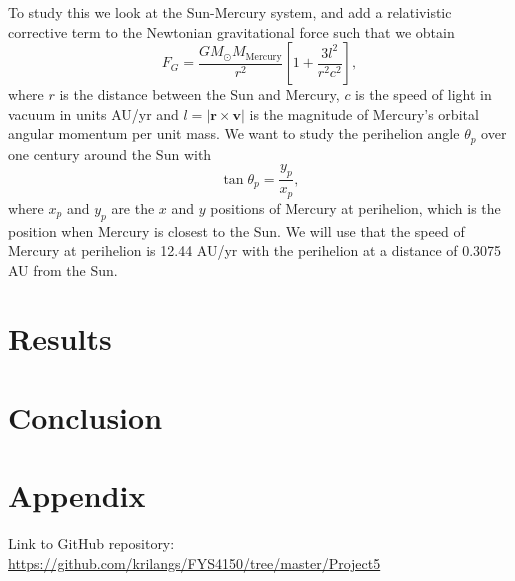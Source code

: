 \documentclass[12pt,a4paper,english]{article}
\begin{document}
To study this we look at the Sun-Mercury system, and add a relativistic corrective term to the Newtonian gravitational force such that we obtain
\begin{equation}
\label{eq:rel_FG}
F_G=\frac{GM_{\odot}M_{\text{Mercury}}}{r^2}\left[1+\frac{3l^2}{r^2c^2}\right],
\end{equation} 
where $r$ is the distance between the Sun and Mercury, $c$ is the speed of light in vacuum in units AU/yr and $l=|\textbf{r}\times \textbf{v}|$ is the magnitude of Mercury's orbital angular momentum per unit mass. We want to study the perihelion angle $\theta_p$ over one century around the Sun with \[\tan\theta_p=\frac{y_p}{x_p},\] where $x_p$ and $y_p$ are the $x$ and $y$ positions of Mercury at perihelion, which is the position when Mercury is closest to the Sun. We will use that the speed of Mercury at perihelion is 12.44 AU/yr with the perihelion at a distance of 0.3075 AU from the Sun.

\section{Results}
\label{sect:Results}
\section{Conclusion}
\label{sect:Conclusion}

\appendix
\section{Appendix}
\label{sect:appendix}
Link to GitHub repository:\\
\url{https://github.com/krilangs/FYS4150/tree/master/Project5}



\end{document}
